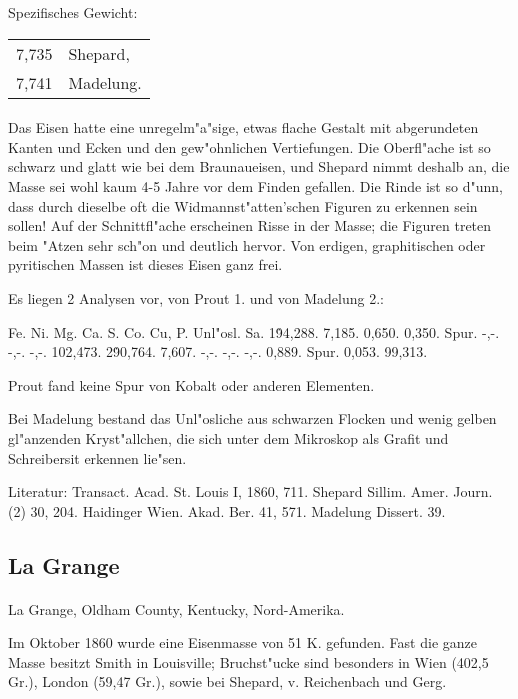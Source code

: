 \documentclass[a4paper, 11pt, oneside]{article}
\begin{document}
Spezifisches Gewicht:  
\begin{table}[!ht]
    \centering
    \begin{tabular}{l l}
        7,735 & Shepard,\\
        7,741 & Madelung.
    \end{tabular}
\end{table}
\paragraph{}
Das Eisen hatte eine unregelm"a"sige, etwas flache Gestalt mit abgerundeten Kanten und Ecken und den gew"ohnlichen Vertiefungen. Die Oberfl"ache ist so schwarz und glatt wie bei dem Braunaueisen, und Shepard nimmt deshalb an, die Masse sei wohl kaum 4-5 Jahre vor dem Finden gefallen. Die Rinde ist so d"unn, dass durch dieselbe oft die Widmannst"atten'schen Figuren zu erkennen sein sollen! Auf der Schnittfl"ache erscheinen Risse in der Masse; die Figuren treten beim "Atzen sehr sch"on und deutlich hervor. Von erdigen, graphitischen oder pyritischen Massen ist dieses Eisen ganz frei.

Es liegen 2 Analysen vor, von Prout 1. und von Madelung 2.:

Fe. Ni. Mg. Ca. S. Co. Cu, P. Unl"osl. Sa.  
1\. 94,288. 7,185. 0,650. 0,350. Spur. -,-. -,-. -,-. 102,473.  
2\. 90,764. 7,607. -,-. -,-. -,-. 0,889. Spur. 0,053. 99,313.

Prout fand keine Spur von Kobalt oder anderen Elementen.

Bei Madelung bestand das Unl"osliche aus schwarzen Flocken und wenig gelben gl"anzenden Kryst"allchen, die sich unter dem Mikroskop als Grafit und Schreibersit erkennen lie"sen.

\footnotesize
Literatur: Transact. Acad. St. Louis I, 1860, 711. Shepard Sillim. Amer. Journ. (2) 30, 204. Haidinger Wien. Akad. Ber. 41, 571. Madelung Dissert. 39.

\subsection{La Grange}
\normalsize
\paragraph{}
La Grange, Oldham County, Kentucky, Nord-Amerika.

Im Oktober 1860 wurde eine Eisenmasse von 51 K. gefunden. Fast die ganze Masse besitzt Smith in Louisville; Bruchst"ucke sind besonders in Wien (402,5 Gr.), London (59,47 Gr.), sowie bei Shepard, v. Reichenbach und Gerg.
\end{document}
